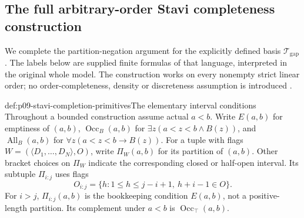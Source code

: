 
\subsection{The full arbitrary-order Stavi completeness construction}
\label{sec:p09-stavi-completeness}

We complete the partition-negation argument for the explicitly
defined basis \(\mathcal T_{\mathrm{gap}}\). The labels below
are supplied finite formulas of that language, interpreted
in the original whole model. The construction works on
every nonempty strict linear order; no order-completeness,
density or discreteness assumption is introduced
\cite[Propositions~5.3--5.4 and Theorem~4.4]{Rabinovich2018Stavi}.

\begin{hbdefinition}{def:p09-stavi-completion-primitives}{The elementary interval conditions}
Throughout a bounded construction assume actual \(a<b\).
Write \(E(a,b)\) for emptiness of \((a,b)\),
\(\operatorname{Occ}_B(a,b)\) for
\(\exists z(a<z<b\land B(z))\), and
\(\operatorname{All}_B(a,b)\) for
\(\forall z(a<z<b\to B(z))\).
For a tuple with flags \(W=(\langle D_1,\ldots,D_N\rangle,O)\),
write \(\Pi_W(a,b)\) for its partition of \((a,b)\).
Other bracket choices on \(\Pi_W\) indicate
the corresponding closed or half-open interval.
Its subtuple \(\Pi_{i:j}\) uses flags
\[
                     O_{i:j}=\{h:1\leq h\leq j-i+1,\ h+i-1\in O\}.
\]
For \(i>j\), \(\Pi_{i:j}(a,b)\) is the bookkeeping
condition \(E(a,b)\), not a positive-length partition.
Its complement under \(a<b\) is
\(\operatorname{Occ}_{\top}(a,b)\).
\end{hbdefinition}

